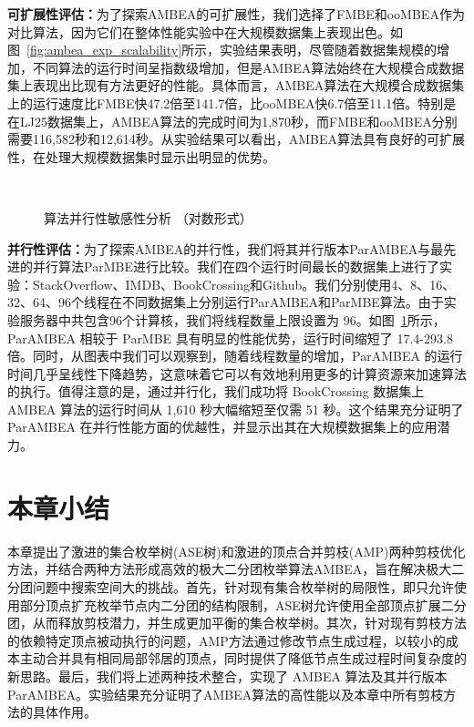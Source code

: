 \textbf{可扩展性评估：}为了探索AMBEA的可扩展性，我们选择了FMBE和ooMBEA作为对比算法，因为它们在整体性能实验中在大规模数据集上表现出色。如图~\ref{fig:ambea_exp_scalability}所示，实验结果表明，尽管随着数据集规模的增加，不同算法的运行时间呈指数级增加，但是AMBEA算法始终在大规模合成数据集上表现出比现有方法更好的性能。具体而言，AMBEA算法在大规模合成数据集上的运行速度比FMBE快47.2倍至141.7倍，比ooMBEA快6.7倍至11.1倍。特别是在LJ25数据集上，AMBEA算法的完成时间为1,870秒，而FMBE和ooMBEA分别需要116,582秒和12,614秒。从实验结果可以看出，AMBEA算法具有良好的可扩展性，在处理大规模数据集时显示出明显的优势。


\begin{figure} [H]
	\centering
  \quad
  \\
  \quad
  

	\caption{算法并行性敏感性分析 （对数形式）}
	\label{fig:ambea_paral}
\end{figure}

\textbf{并行性评估：}为了探索AMBEA的并行性，我们将其并行版本ParAMBEA与最先进的并行算法ParMBE进行比较。我们在四个运行时间最长的数据集上进行了实验：StackOverflow、IMDB、BookCrossing和Github。我们分别使用4、8、16、32、64、96个线程在不同数据集上分别运行ParAMBEA和ParMBE算法。由于实验服务器中共包含96个计算核，我们将线程数量上限设置为 96。如图~\ref{fig:ambea_paral}所示，ParAMBEA 相较于 ParMBE 具有明显的性能优势，运行时间缩短了 17.4-293.8 倍。同时，从图表中我们可以观察到，随着线程数量的增加，ParAMBEA 的运行时间几乎呈线性下降趋势，这意味着它可以有效地利用更多的计算资源来加速算法的执行。值得注意的是，通过并行化，我们成功将 BookCrossing 数据集上 AMBEA 算法的运行时间从 1,610 秒大幅缩短至仅需 51 秒。这个结果充分证明了ParAMBEA 在并行性能方面的优越性，并显示出其在大规模数据集上的应用潜力。

\section{本章小结}

本章提出了激进的集合枚举树(ASE树)和激进的顶点合并剪枝(AMP)两种剪枝优化方法，并结合两种方法形成高效的极大二分团枚举算法AMBEA，旨在解决极大二分团问题中搜索空间大的挑战。首先，针对现有集合枚举树的局限性，即只允许使用部分顶点扩充枚举节点内二分团的结构限制，ASE树允许使用全部顶点扩展二分团，从而释放剪枝潜力，并生成更加平衡的集合枚举树。其次，针对现有剪枝方法的依赖特定顶点被动执行的问题，AMP方法通过修改节点生成过程，以较小的成本主动合并具有相同局部邻居的顶点，同时提供了降低节点生成过程时间复杂度的新思路。最后，我们将上述两种技术整合，实现了 AMBEA 算法及其并行版本 ParAMBEA。实验结果充分证明了AMBEA算法的高性能以及本章中所有剪枝方法的具体作用。
